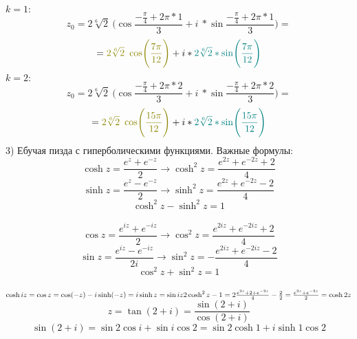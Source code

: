 \documentclass[14pt]{extarticle}
\begin{document}
$k=1:$
\begin{displaymath}
    z_0=2\sqrt[6]{2} \ \Biggl(\cos \frac{-\frac{\pi}{4}+2\pi * 1}{3}+
    i \ * \sin \frac{-\frac{\pi}{4}+2\pi * 1}{3}\Biggr)=
\end{displaymath}
\begin{displaymath}
    = \textcolor{olive}{2\sqrt[6]{2} \ \cos \Biggl(\frac{7\pi}{12}\Biggr)}+
    i * \textcolor{teal}{2\sqrt[6]{2}* \sin \Biggl(\frac{7\pi}{12}\Biggr)}
\end{displaymath}
$k=2:$
\begin{displaymath}
    z_0=2\sqrt[6]{2} \ \Biggl(\cos \frac{-\frac{\pi}{4}+2\pi * 2}{3}+
    i \ * \sin \frac{-\frac{\pi}{4}+2\pi * 2}{3}\Biggr)=
\end{displaymath}
\begin{displaymath}
    = \textcolor{olive}{2\sqrt[6]{2} \ \cos \Biggl(\frac{15\pi}{12}\Biggr)}+
    i * \textcolor{teal}{2\sqrt[6]{2}* \sin \Biggl(\frac{15\pi}{12}\Biggr)}
\end{displaymath}
3)
Ебучая пизда с гиперболическими функциями. Важные формулы:
\begin{displaymath}
    \cosh z = \frac{e^z+e^{-z}}{2} \rightarrow 
    \cosh^2 z = \frac{e^{2z}+e^{-2z}+2}{4}
\end{displaymath}
\begin{displaymath}
    \sinh z = \frac{e^z-e^{-z}}{2} \rightarrow 
    \sinh^2 z = \frac{e^{2z}+e^{-2z}-2}{4}
\end{displaymath}
$$\cosh ^2 z - \sinh ^2 z = 1$$
\\
\begin{displaymath}
    \cos z =\frac{e^{iz}+e^{-iz}}{2} \rightarrow 
    \cos^2 z = \frac{e^{2iz}+e^{-2iz}+2}{4}
\end{displaymath}
\begin{displaymath}
    \sin z = \frac{e^{iz}-e^{-iz}}{2i} \rightarrow 
    \sin^2 z = -\frac{e^{2iz}+e^{-2iz}-2}{4}
\end{displaymath}
$$\cos ^2 z + \sin ^2 z = 1$$
\\
$\cosh iz = \cos z = \cos (-z)\\ -i \sinh (-z) = i\sinh z = \sin iz\\
2\cosh^2z - 1 = 2\frac{e^{2z}+2+e^{-2z}}{4} - \frac{2}{2}
= \frac{e^{2z}+e^{-2z}}{2}=\cosh2z$
\begin{displaymath}
    z=\tan(2+i)=\frac{\sin(2+i)}{\cos(2+i)}
\end{displaymath}
\begin{displaymath}
    \sin(2+i) = \sin2\cos i + \sin i \cos 2 = 
    \sin 2 \cosh 1 + i \sinh 1 \cos 2
\end{displaymath}
\end{document}
